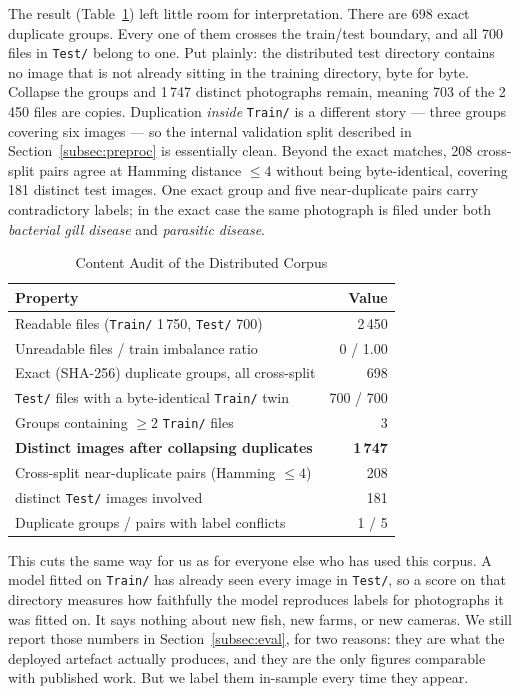 \documentclass[conference]{IEEEtran}
\begin{document}
The result (Table~\ref{tab:audit}) left little room for interpretation. There are 698 exact duplicate groups. Every one of them crosses the train/test boundary, and all 700 files in \texttt{Test/} belong to one. Put plainly: the distributed test directory contains no image that is not already sitting in the training directory, byte for byte. Collapse the groups and 1\,747 distinct photographs remain, meaning 703 of the 2\,450 files are copies. Duplication \emph{inside} \texttt{Train/} is a different story --- three groups covering six images --- so the internal validation split described in Section~\ref{subsec:preproc} is essentially clean. Beyond the exact matches, 208 cross-split pairs agree at Hamming distance $\leq 4$ without being byte-identical, covering 181 distinct test images. One exact group and five near-duplicate pairs carry contradictory labels; in the exact case the same photograph is filed under both \emph{bacterial gill disease} and \emph{parasitic disease}.

\begin{table}[!t]
\caption{Content Audit of the Distributed Corpus}
\label{tab:audit}
\centering
\footnotesize
\begin{tabular}{lr}
\toprule
\textbf{Property} & \textbf{Value}\\
\midrule
Readable files (\texttt{Train/} 1\,750, \texttt{Test/} 700) & 2\,450\\
Unreadable files / train imbalance ratio & 0 / 1.00\\
Exact (SHA-256) duplicate groups, all cross-split & 698\\
\texttt{Test/} files with a byte-identical \texttt{Train/} twin & 700 / 700\\
Groups containing $\geq 2$ \texttt{Train/} files & 3\\
\textbf{Distinct images after collapsing duplicates} & \textbf{1\,747}\\
Cross-split near-duplicate pairs (Hamming $\leq 4$) & 208\\
\quad distinct \texttt{Test/} images involved & 181\\
Duplicate groups / pairs with label conflicts & 1 / 5\\
\bottomrule
\end{tabular}
\end{table}

This cuts the same way for us as for everyone else who has used this corpus. A model fitted on \texttt{Train/} has already seen every image in \texttt{Test/}, so a score on that directory measures how faithfully the model reproduces labels for photographs it was fitted on. It says nothing about new fish, new farms, or new cameras. We still report those numbers in Section~\ref{subsec:eval}, for two reasons: they are what the deployed artefact actually produces, and they are the only figures comparable with published work. But we label them in-sample every time they appear.
\end{document}
